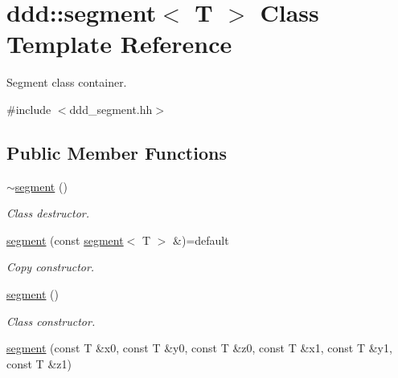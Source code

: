 \hypertarget{classddd_1_1segment}{}\section{ddd\+:\+:segment$<$ T $>$ Class Template Reference}
\label{classddd_1_1segment}


Segment class container.  




{\ttfamily \#include $<$ddd\+\_\+segment.\+hh$>$}

\subsection*{Public Member Functions}
\begin{DoxyCompactItemize}
\item 
\mbox{\label{classddd_1_1segment_a90f0a91b7cf1e39d8c385ff23bd6af5d}} 
\hyperlink{classddd_1_1segment_a90f0a91b7cf1e39d8c385ff23bd6af5d}{$\sim$segment} ()
\begin{DoxyCompactList}\small\item\em Class destructor. \end{DoxyCompactList}\item 
\mbox{\label{classddd_1_1segment_ad6ed63172c53846edce9a982ea54f734}} 
\hyperlink{classddd_1_1segment_ad6ed63172c53846edce9a982ea54f734}{segment} (const \hyperlink{classddd_1_1segment}{segment}$<$ T $>$ \&)=default
\begin{DoxyCompactList}\small\item\em Copy constructor. \end{DoxyCompactList}\item 
\mbox{\label{classddd_1_1segment_a11949f0ad3906498f0625230b5a04fa7}} 
\hyperlink{classddd_1_1segment_a11949f0ad3906498f0625230b5a04fa7}{segment} ()
\begin{DoxyCompactList}\small\item\em Class constructor. \end{DoxyCompactList}\item 
\mbox{\label{classddd_1_1segment_a4a0a5e0d31877978f3f3652fa3097162}} 
\hyperlink{classddd_1_1segment_a4a0a5e0d31877978f3f3652fa3097162}{segment} (const T \&x0, const T \&y0, const T \&z0, const T \&x1, const T \&y1, const T \&z1)

\end{DoxyCompactItemize}
